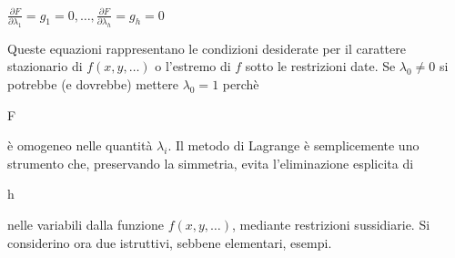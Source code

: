 \begin{center}
 \begin{math}
  \frac{\partial F}{\partial{\lambda_1}} = g_1 = 0, \dots, \frac{\partial F}{\partial{\lambda_h}} = g_h = 0 
 \end{math}

\end{center} 
Queste equazioni rappresentano le condizioni desiderate 
per il carattere stazionario di \begin{math}
                                 f(x,y,\dots)
                                \end{math} o l'estremo di \begin{math}
                                                           f
                                                          \end{math} sotto le restrizioni date. 
Se \begin{math}
    \lambda_0 \ne 0
   \end{math} si potrebbe (e dovrebbe) mettere \begin{math}
                                                \lambda_0 = 1
                                               \end{math} perch\`e \begin{it}
                                                                    F
                                                                   \end{it}
 \`e omogeneo nelle quantit\`a \begin{math}      \lambda_i           \end{math}. Il metodo di Lagrange \`e semplicemente 
uno strumento che, preservando la simmetria, evita l'eliminazione esplicita di \begin{it}
                                                                                h
                                                                               \end{it} nelle variabili 
dalla funzione \begin{math} f(x,y,\dots)
                                \end{math}, mediante restrizioni sussidiarie. Si considerino ora due 
istruttivi, sebbene elementari, esempi.\\
